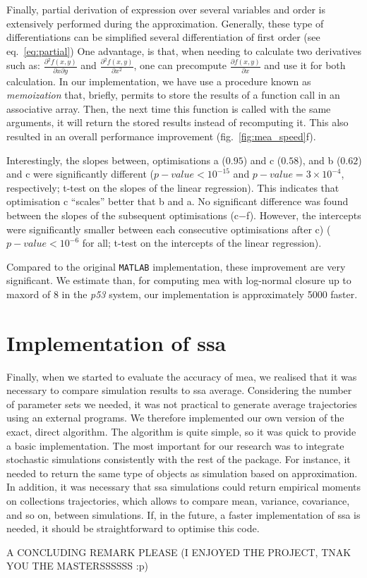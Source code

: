 \documentclass[11pt,a4paper]{article}
\newcommand{\pft}{\textit{p53}}
\newcommand{\mat}{\texttt{MATLAB}}
\begin{document}
Finally, partial derivation of expression over several variables and order is extensively performed during the approximation.
Generally, these type of differentiations can be simplified several differentiation of first order (see eq.~\ref{eq:partial})
One advantage, is that, when needing to calculate two derivatives such as: $\frac{\partial{} ^ 2 f(x,y)}{\partial{} x \partial{} y}$ and $\frac{\partial{} ^ 2 f(x,y)}{\partial{} x^2}$,
one can precompute $\frac{\partial{} f(x,y)}{\partial{} x}$ and use it for both calculation.
In our implementation, we have use a procedure known as \emph{memoization} that, briefly, permits to store the results of a function call in an associative array.
Then, the next time this function is called with the same arguments, it will return the stored results instead of recomputing it.
This also resulted in an overall performance improvement (fig.~\ref{fig:mea_speed}f).

Interestingly, the slopes between, optimisations a ($0.95$) and c ($0.58$), and b ($0.62$) and c were significantly different ($p-value <10^{-15}$ and $p-value = 3 \times 10^{-4}$, respectively;
t-test on the slopes of the linear regression). This indicates that optimisation c ``scales'' better that b and a.
No significant difference was found between the slopes of the subsequent optimisations (c$-$f).
However, the intercepts were significantly smaller between each consecutive optimisations after c) ($p-value < 10^{-6}$ for all; t-test on the intercepts of the linear regression).

Compared to the original \mat{} implementation, these improvement are very significant. We estimate than, for computing \gls{mea} with log-normal closure up to \gls{maxord}
of 8 in the \pft{} system, our implementation is approximately 5000 faster.

\section{Implementation of \acrlong{ssa}}
Finally, when we started to evaluate the accuracy of \gls{mea}, we realised that it was necessary to compare simulation results to \gls{ssa} average\cite{gillespie_general_19706}.
Considering the number of parameter sets we needed, it was not practical to generate average trajectories using an external programs.
We therefore implemented our own version of the exact, direct algorithm.
The algorithm is quite simple, so it was quick to provide a basic implementation.
The most important for our research was to integrate stochastic simulations consistently with the rest of the package.
For instance, it needed to return the same type of objects as simulation based on approximation.
In addition, it was necessary that \gls{ssa} simulations could return empirical moments on collections trajectories, which allows to compare mean, variance, covariance, and so on, between simulations.
If, in the future, a faster implementation of \gls{ssa} is needed, it should be straightforward to optimise this code.

A CONCLUDING REMARK PLEASE (I ENJOYED THE PROJECT, TNAK YOU THE MASTERSSSSSS :p)

\newpage{}
{}

\end{document}
